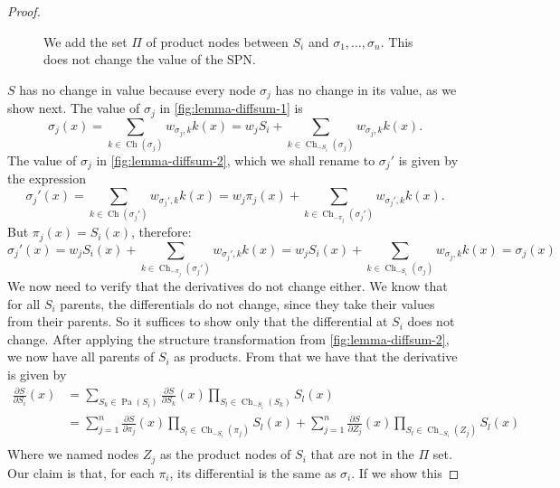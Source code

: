 \documentclass{amsart}
\DeclareMathOperator*{\Ch}{\text{Ch}}
\DeclareMathOperator*{\Pa}{\text{Pa}}
\theoremstyle{plain}
\numberwithin{equation}{section}
\begin{document}
\begin{proof}
\begin{figure}[h]
    \caption{We add the set $\Pi$ of product nodes between $S_i$ and $\sigma_1,\ldots,\sigma_n$.
      This does not change the value of the SPN.}\label{fig:lemma-diffsum-2}
  \end{figure}
  $S$ has no change in value because every node $\sigma_j$ has no change in its value, as we show
  next. The value of $\sigma_j$ in \autoref{fig:lemma-diffsum-1} is
  \begin{equation*}
    \sigma_j(x)=\sum_{k\in\Ch(\sigma_j)} w_{\sigma_j,k}k(x)=w_j S_i+\sum_{k\in\Ch_{-S_i}(\sigma_j)}
      w_{\sigma_j,k}k(x).
  \end{equation*}
  The value of $\sigma_j$ in \autoref{fig:lemma-diffsum-2}, which we shall rename to $\sigma_j'$ is
  given by the expression
  \begin{equation*}
    \sigma_j'(x)=\sum_{k\in\Ch(\sigma_j')} w_{\sigma_j',k}k(x)=w_j \pi_j(x)+\sum_{k\in\Ch_{-\pi_j}
      (\sigma_j')}w_{\sigma_j',k}k(x).
  \end{equation*}
  But $\pi_j(x)=S_i(x)$, therefore:
  \begin{equation*}
    \sigma_j'(x)=w_j S_i(x)+\sum_{k\in\Ch_{-\pi_j}(\sigma_j')}w_{\sigma_j',k}k(x)=w_j
    S_i(x)+\sum_{k\in\Ch_{-S_i}(\sigma_j)} w_{\sigma_j,k}k(x)=\sigma_j(x)
  \end{equation*}
  We now need to verify that the derivatives do not change either. We know that for all $S_i$
  parents, the differentials do not change, since they take their values from their parents. So it
  suffices to show only that the differential at $S_i$ does not change. After applying the
  structure transformation from \autoref{fig:lemma-diffsum-2}, we now have all parents of $S_i$ as
  products. From that we have that the derivative is given by
  \begin{equation}
    \begin{split}
    \frac{\partial S}{\partial S_i}(x)
      &=\sum_{S_k\in\Pa(S_i)}\frac{\partial S}{\partial S_k}(x)\prod_{S_l\in\Ch_{-S_i}(S_k)}
        S_l(x)\\
      &=\sum_{j=1}^n\frac{\partial S}{\partial\pi_j}(x)\prod_{S_l\in\Ch_{-S_i}(\pi_j)}S_l(x)+
        \sum_{j=1}^n\frac{\partial S}{\partial Z_j}(x)\prod_{S_l\in\Ch_{-S_i}(Z_j)}S_l(x)\\
      \label{eq:lemma-diffsum-eq}
    \end{split}
  \end{equation}
  Where we named nodes $Z_j$ as the product nodes of $S_i$ that are not in the $\Pi$ set. Our
  claim is that, for each $\pi_i$, its differential is the same as $\sigma_i$. If we show this

\end{proof}
\end{document}

